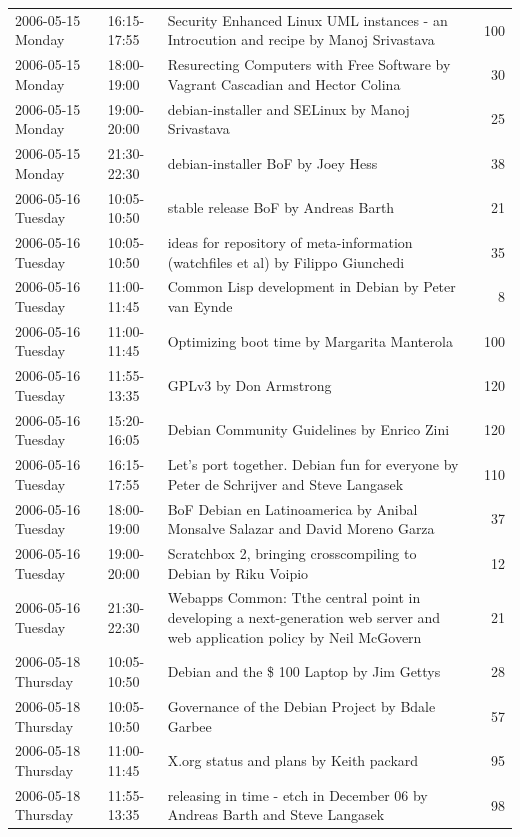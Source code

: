 \documentclass[mingoth,a4paper]{jsarticle}
\begin{document}
\begin{minipage}[t]{0.7\hsize}
\begin{center}
{\begin{tabular}{|l|l|p{20em}|r|}
 2006-05-15 Monday & 16:15-17:55 & Security Enhanced Linux UML instances - an Introcution and recipe by Manoj Srivastava &  ~100 \\
 2006-05-15 Monday & 18:00-19:00 & Resurecting Computers with Free Software by Vagrant Cascadian and Hector Colina &  30 \\
 2006-05-15 Monday & 19:00-20:00 & debian-installer and SELinux by Manoj Srivastava &  ~25 \\
 2006-05-15 Monday & 21:30-22:30 & debian-installer BoF by Joey Hess &  38 \\
 2006-05-16 Tuesday & 10:05-10:50 & stable release BoF by Andreas Barth &  21 \\
 2006-05-16 Tuesday & 10:05-10:50 & ideas for repository of meta-information (watchfiles et al) by Filippo Giunchedi &  35 \\
 2006-05-16 Tuesday & 11:00-11:45 & Common Lisp development in Debian by Peter van Eynde &  8 \\
 2006-05-16 Tuesday & 11:00-11:45 & Optimizing boot time by Margarita Manterola &  100 \\
 2006-05-16 Tuesday & 11:55-13:35 & GPLv3 by Don Armstrong &  120 \\
 2006-05-16 Tuesday & 15:20-16:05 & Debian Community Guidelines by Enrico Zini &  120 \\
 2006-05-16 Tuesday & 16:15-17:55 & Let's port together. Debian fun for everyone by Peter de Schrijver and Steve Langasek &  110 \\
 2006-05-16 Tuesday & 18:00-19:00 & BoF Debian en Latinoamerica by Anibal Monsalve Salazar and David Moreno Garza &  37 \\
 2006-05-16 Tuesday & 19:00-20:00 & Scratchbox 2, bringing crosscompiling to Debian by Riku Voipio &  12 \\
 2006-05-16 Tuesday & 21:30-22:30 & Webapps Common: Tthe central point in developing a next-generation web server and web application policy by Neil McGovern &  21 \\
 2006-05-18 Thursday & 10:05-10:50 & Debian and the \$ 100 Laptop by Jim Gettys &  28 \\
 2006-05-18 Thursday & 10:05-10:50 & Governance of the Debian Project by Bdale Garbee &  57 \\
 2006-05-18 Thursday & 11:00-11:45 & X.org status and plans by Keith packard &  95 \\
 2006-05-18 Thursday & 11:55-13:35 & releasing in time - etch in December 06 by Andreas Barth and Steve Langasek &  98 \\

\end{tabular}}
\end{center}
\end{minipage}
\end{document}
